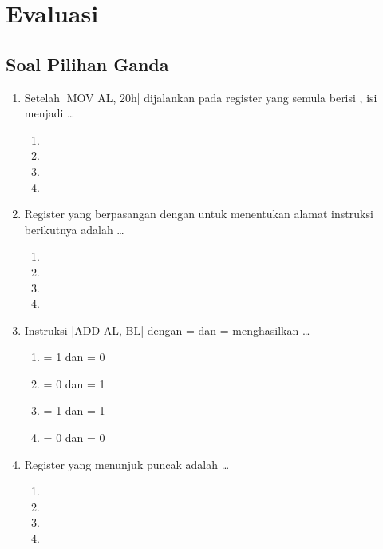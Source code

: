 \section{Evaluasi}
\label{sec:evaluasi-bab5}

\subsection{Soal Pilihan Ganda}

\begin{enumerate}
    \item Setelah \lstasm|MOV AL, 20h| dijalankan pada register
           yang semula berisi , isi 
          menjadi \dots
          \begin{enumerate}
              \item {} \item {}
              \item {} \item {}
          \end{enumerate}

    \item Register yang berpasangan dengan  untuk menentukan
          alamat instruksi berikutnya adalah \dots
          \begin{enumerate}
              \item {} \item {}
              \item {} \item {}
          \end{enumerate}

    \item Instruksi \lstasm|ADD AL, BL| dengan  = 
          dan  =  menghasilkan \dots
          \begin{enumerate}
              \item {} = 1 dan  = 0
              \item {} = 0 dan  = 1
              \item {} = 1 dan  = 1
              \item {} = 0 dan  = 0
          \end{enumerate}

    \item Register yang menunjuk puncak  adalah \dots
          \begin{enumerate}
              \item {} \item {}
              \item {} \item {}
          \end{enumerate}


\end{enumerate}
